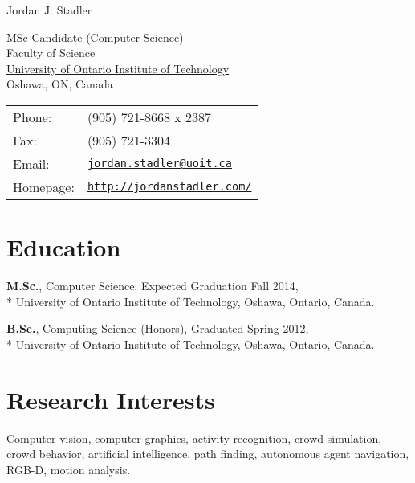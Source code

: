 \documentclass[letterpaper]{article}
\def\name{Jordan J. Stadler}
\renewenvironment{itemize}{
  \begin{list}{}{
    \setlength{\leftmargin}{1.5em}
  }
}{
  \end{list}
}
\begin{document}
{\huge \name}


\vspace{0.25in}

\begin{minipage}{0.45\linewidth}
  MSc Candidate (Computer Science) \\
  Faculty of Science \\
 \href{http://www.uoit.ca/}{University of Ontario Institute of Technology} \\
  Oshawa, ON, Canada
\end{minipage}
\begin{minipage}{0.45\linewidth}
  \begin{tabular}{ll}
    Phone: & (905) 721-8668 x 2387\\
    Fax: &  (905) 721-3304 \\
    Email: & \href{mailto:jordan.stadler@uoit.ca}{\tt jordan.stadler@uoit.ca} \\
    Homepage: & \href{http://jordanstadler.com/}{\tt http://jordanstadler.com/} \\
  \end{tabular}
\end{minipage}


\section*{Education}

\begin{itemize}
  \item \textbf{M.Sc.}, Computer Science, Expected Graduation Fall 2014,\\*
    University of Ontario Institute of Technology, Oshawa, Ontario, Canada.
  \item\textbf{B.Sc.}, Computing Science (Honors), Graduated Spring 2012,\\*
    University of Ontario Institute of Technology, Oshawa, Ontario, Canada.
\end{itemize}

\section*{Research Interests}
\begin{itemize}
\item Computer vision, computer graphics, activity recognition, crowd simulation, crowd behavior, artificial intelligence, path finding, autonomous agent navigation, RGB-D, motion analysis.
\end{itemize}
\end{document}
